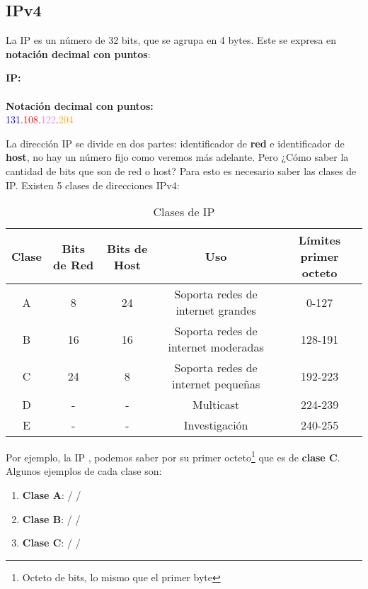 \documentclass[
	12pt, %
	fleqn, %
	a4paper, %
]{LegrandOrangeBook}
\begin{document}
\subsection{IPv4}
La IP es un número de 32 bits, que se agrupa en 4 bytes. Este se expresa en \textbf{notación decimal con puntos}:
\begin{center}
\textbf{IP:}\\
\ipAddress{\textcolor{blue}{10000011}\textcolor{red}{01101100}\textcolor{violet}{01111010}\textcolor{orange}{11001100}}\\
\textbf{Notación decimal con puntos:}\\
\textcolor{blue}{131}.\textcolor{red}{108}.\textcolor{violet}{122}.\textcolor{orange}{204}
\end{center}
La dirección IP se divide en dos partes: identificador de \textbf{red} e identificador de \textbf{host}, no hay un número fijo como veremos más adelante. Pero ¿Cómo saber la cantidad de bits que son de red o host? Para esto es necesario saber las clases de IP. Existen 5 clases de direcciones IPv4:
\begin{table}[H]
\begin{center}
\begin{tabular}{|c|c|c|c|c|}
\hline
\rowcolor[HTML]{DAE8FC} 
Clase & Bits de Red & Bits de Host & Uso                                 & Límites primer octeto \\ \hline
A     & 8           & 24           & Soporta redes de internet grandes   & 0-127                 \\ \hline
B     & 16          & 16           & Soporta redes de internet moderadas & 128-191               \\ \hline
C     & 24          & 8            & Soporta redes de internet pequeñas  & 192-223               \\ \hline
D     & -           & -            & Multicast                           & 224-239               \\ \hline
E     & -           & -            & Investigación                       & 240-255               \\ \hline
\end{tabular}
\end{center}
\caption{Clases de IP}
\end{table}
Por ejemplo, la IP , podemos saber por su primer octeto\footnote{Octeto de bits, lo mismo que el primer byte} que es de \textbf{clase C}. Algunos ejemplos de cada clase son:
\begin{enumerate}
\item \textbf{Clase A}: / / 
\item \textbf{Clase B}: / / 
\item \textbf{Clase C}: / / 
\end{enumerate}
\end{document}
